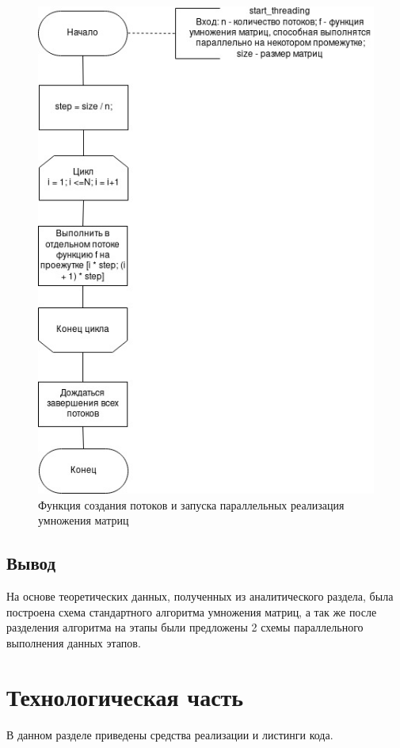 \documentclass[12pt]{report}
\begin{document}
\begin{figure}[h]
	\centering
	\includegraphics[scale=1]{start_threading.jpg}
	\caption{Функция создания потоков и запуска параллельных реализация умножения матриц}
	\label{fig:mpr}
\end{figure}


\section{Вывод}
На основе теоретических данных, полученных из аналитического раздела, была построена схема стандартного алгоритма умножения матриц, а так же после разделения алгоритма на этапы были предложены 2 схемы параллельного выполнения данных этапов.

\chapter{Технологическая часть}

В данном разделе приведены средства реализации и листинги кода.
\end{document}
